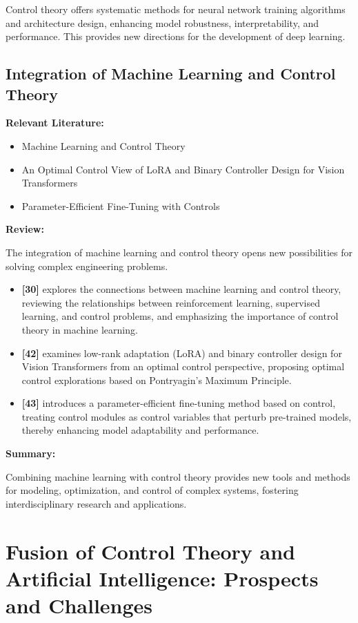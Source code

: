 \documentclass{article}
\theoremstyle{plain}
\theoremstyle{definition}
\theoremstyle{remark}
\begin{document}
Control theory offers systematic methods for neural network training algorithms and architecture design, enhancing model robustness, interpretability, and performance. This provides new directions for the development of deep learning.

\subsection{Integration of Machine Learning and Control Theory}
\textbf{Relevant Literature:}
\begin{itemize}
    \item Machine Learning and Control Theory
    \item An Optimal Control View of LoRA and Binary Controller Design for Vision Transformers
    \item Parameter-Efficient Fine-Tuning with Controls
\end{itemize}

\textbf{Review:}

The integration of machine learning and control theory opens new possibilities for solving complex engineering problems.

\begin{itemize}
    \item \textbf{[30]} explores the connections between machine learning and control theory, reviewing the relationships between reinforcement learning, supervised learning, and control problems, and emphasizing the importance of control theory in machine learning.
    
    \item \textbf{[42]} examines low-rank adaptation (LoRA) and binary controller design for Vision Transformers from an optimal control perspective, proposing optimal control explorations based on Pontryagin's Maximum Principle.
    
    \item \textbf{[43]} introduces a parameter-efficient fine-tuning method based on control, treating control modules as control variables that perturb pre-trained models, thereby enhancing model adaptability and performance.
\end{itemize}

\textbf{Summary:}

Combining machine learning with control theory provides new tools and methods for modeling, optimization, and control of complex systems, fostering interdisciplinary research and applications.

\section{Fusion of Control Theory and Artificial Intelligence: Prospects and Challenges}
\end{document}
